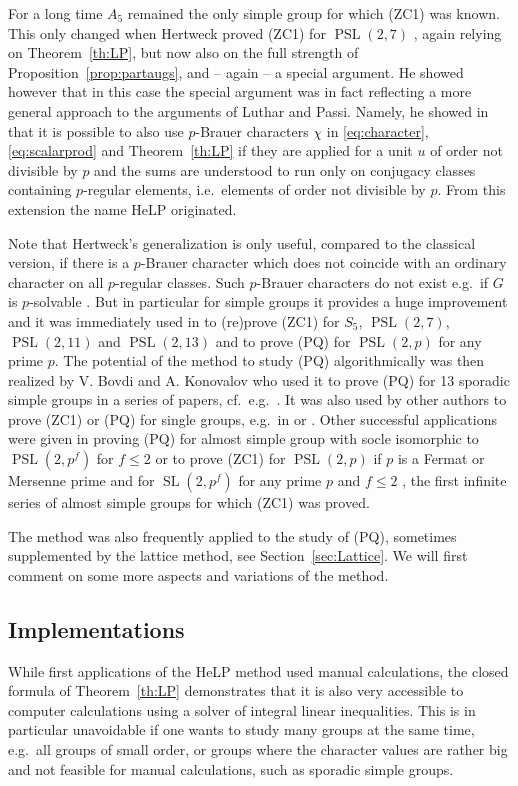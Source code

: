 \documentclass[10pt,a4paper,reqno]{amsart}
\theoremstyle{definition}
\theoremstyle{remark}
\newcommand{\SL}{\operatorname{SL}}
\newcommand{\PSL}{\operatorname{PSL}}
\begin{document}
For a long time $A_5$ remained the only simple group for which (ZC1) was known. This only changed when Hertweck proved (ZC1) for $\PSL(2,7)$ \cite[Example 3.6]{Her06}, again relying on Theorem~\ref{th:LP}, but now also on the full strength of Proposition~\ref{prop:partaugs}, and -- again -- a special argument. He showed however that in this case the special argument was in fact reflecting a more general approach to the arguments of Luthar and Passi. Namely, he showed in \cite{HertweckBrauer} that it is possible to also use $p$-Brauer characters $\chi$ in \eqref{eq:character}, \eqref{eq:scalarprod} and Theorem~\ref{th:LP} if they are applied for a unit $u$ of order not divisible by $p$ and the sums are understood to run only on conjugacy classes containing $p$-regular elements, i.e.\ elements of order not divisible by $p$. From this extension the name HeLP originated.

Note that Hertweck's generalization is only useful, compared to the classical version, if there is a $p$-Brauer character which does not coincide with an ordinary character on all $p$-regular classes. Such $p$-Brauer characters do not exist e.g.\ if $G$ is $p$-solvable \cite[Theorem 22.1]{CR81}. But in particular for simple groups it provides a huge improvement and it was immediately used in \cite{HertweckBrauer} to (re)prove (ZC1) for $S_5$, $\PSL(2,7)$, $\PSL(2,11)$ and $\PSL(2,13)$ and to prove (PQ) for $\PSL(2,p)$ for any prime $p$. The potential of the method to study (PQ) algorithmically was then realized by V. Bovdi and A. Konovalov who used it to prove (PQ) for 13 sporadic simple groups in a series of papers, cf.\ e.g.\ \cite{BKL08}. It was also used by other authors to prove (ZC1) or (PQ) for single groups, e.g.\ in \cite{Gil13} or \cite{KK16}. Other successful applications were given in \cite{4primaryI} proving (PQ) for almost simple group with socle isomorphic to $\PSL(2,p^f)$ for $f \leqslant 2$ or to prove (ZC1) for $\PSL(2,p)$ if $p$ is a Fermat or Mersenne prime \cite{MdRS19} and for $\SL(2,p^f)$ for any prime $p$ and $f \leqslant 2$ \cite{dRS19}, the first infinite series of almost simple groups for which (ZC1) was proved.

The method was also frequently applied to the study of (PQ), sometimes supplemented by the lattice method, see Section~\ref{sec:Lattice}. We will first comment on some more aspects and variations of the method. 

\subsection{Implementations}
While first applications of the HeLP method used manual calculations, the closed formula of Theorem~\ref{th:LP} demonstrates that it is also very accessible to computer calculations using a solver of integral linear inequalities. This is in particular unavoidable if one wants to study many groups at the same time, e.g.\ all groups of small order, or groups where the character values are rather big and not feasible for manual calculations, such as sporadic simple groups.
\end{document}
